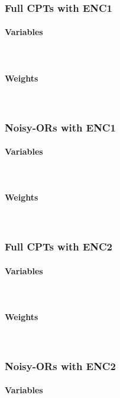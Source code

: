 \documentclass{article}
\begin{document}
\subsubsection{Full CPTs with ENC1}
\paragraph{Variables}\mbox{}\\

\paragraph{Weights}\mbox{}\\


\subsubsection{Noisy-ORs with ENC1}
\paragraph{Variables}\mbox{}\\

\paragraph{Weights}\mbox{}\\


\subsubsection{Full CPTs with ENC2}
\paragraph{Variables}\mbox{}\\

\paragraph{Weights}\mbox{}\\


\subsubsection{Noisy-ORs with ENC2}
\paragraph{Variables}\mbox{}\\

\end{document}
